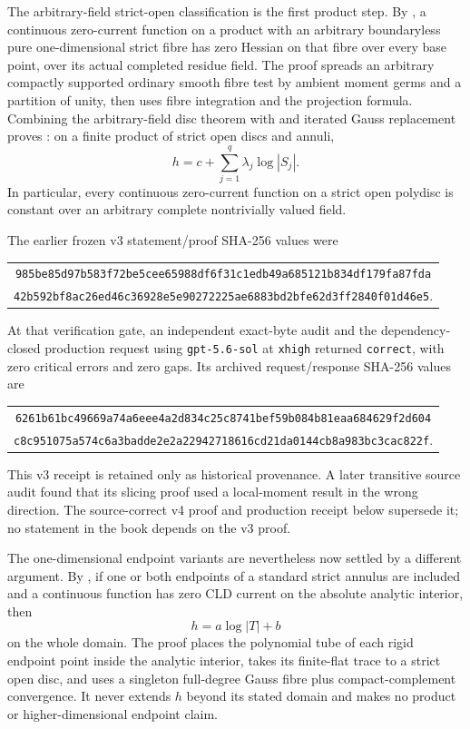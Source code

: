 The arbitrary-field strict-open classification is the first product step.
By
, a continuous
zero-current function on a product with an arbitrary boundaryless pure
one-dimensional strict fibre has zero Hessian on that fibre over every base
point, over its actual completed residue field.  The proof spreads an
arbitrary compactly supported ordinary smooth fibre test by ambient moment
germs and a partition of unity, then uses fibre integration and the
projection formula.  Combining the arbitrary-field disc theorem with
 and iterated Gauss
replacement proves
: on a finite product
of strict open discs and annuli,
\[
                    h=c+\sum_{j=1}^{q}\lambda_j\log|S_j|.
\]
In particular, every continuous zero-current function on a strict open
polydisc is constant over an arbitrary complete nontrivially valued field.

The earlier frozen v3 statement/proof SHA-256 values were
\begin{center}
\small
\begin{tabular}{@{}c@{}}
\nolinkurl{985be85d97b583f72be5cee65988df6f31c1edb49a685121b834df179fa87fda}\\
\nolinkurl{42b592bf8ac26ed46c36928e5e90272225ae6883bd2bfe62d3ff2840f01d46e5}.
\end{tabular}
\end{center}
At that verification gate, an independent exact-byte audit and the
dependency-closed production request using \texttt{gpt-5.6-sol} at
\texttt{xhigh} returned \texttt{correct}, with zero critical errors and zero
gaps.  Its archived request/response SHA-256 values are
\begin{center}
\small
\begin{tabular}{@{}c@{}}
\nolinkurl{6261b61bc49669a74a6eee4a2d834c25c8741bef59b084b81eaa684629f2d604}\\
\nolinkurl{c8c951075a574c6a3badde2e2a22942718616cd21da0144cb8a983bc3cac822f}.
\end{tabular}
\end{center}
This v3 receipt is retained only as historical provenance.  A later
transitive source audit found that its slicing proof used a local-moment
result in the wrong direction.  The source-correct v4 proof and production
receipt below supersede it; no statement in the book depends on the v3
proof.

The one-dimensional endpoint variants are nevertheless now settled by a
different argument.  By
, if one or both endpoints
of a standard strict annulus are included and a continuous function has
zero CLD current on the absolute analytic interior, then
\[
                              h=a\log|T|+b
\]
on the whole domain.  The proof places the polynomial tube of each rigid
endpoint point inside the analytic interior, takes its finite-flat trace to
a strict open disc, and uses a singleton full-degree Gauss fibre plus
compact-complement convergence.  It never extends \(h\) beyond its stated
domain and makes no product or higher-dimensional endpoint claim.


